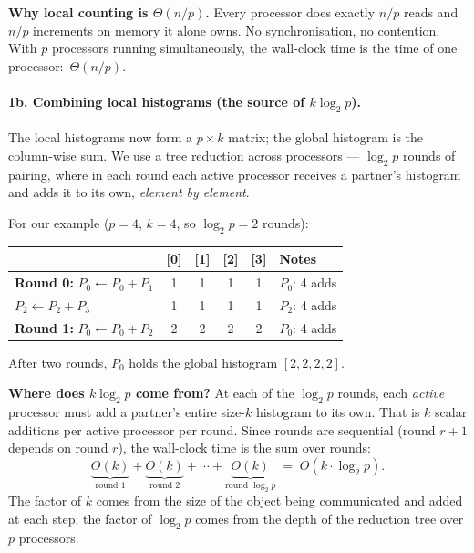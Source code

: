 \begin{ppkey}
\textbf{Why local counting is $\Theta(n/p)$.} Every processor does
exactly $n/p$ reads and $n/p$ increments on memory it alone owns. No
synchronisation, no contention. With $p$ processors running
simultaneously, the wall-clock time is the time of one
processor:~$\Theta(n/p)$.
\end{ppkey}

\paragraph{1b. Combining local histograms (the source of $k\log_2 p$).}
The local histograms now form a $p \times k$ matrix; the global
histogram is the column-wise sum. We use a tree reduction across
processors --- $\log_2 p$ rounds of pairing, where in each round each
active processor receives a partner's histogram and adds it to its own,
\emph{element by element}.

For our example ($p=4$, $k=4$, so $\log_2 p = 2$ rounds):
\begin{center}
\begin{tabular}{l|cccc|l}
\toprule
& \textbf{[0]} & \textbf{[1]} & \textbf{[2]} & \textbf{[3]} & \textbf{Notes} \\
\midrule
\textbf{Round 0:} $P_0 \leftarrow P_0 + P_1$ & 1 & 1 & 1 & 1 & $P_0$: 4 adds \\
\quad\quad\quad\;\; $P_2 \leftarrow P_2 + P_3$ & 1 & 1 & 1 & 1 & $P_2$: 4 adds \\
\midrule
\textbf{Round 1:} $P_0 \leftarrow P_0 + P_2$ & 2 & 2 & 2 & 2 & $P_0$: 4 adds \\
\bottomrule
\end{tabular}
\end{center}
After two rounds, $P_0$ holds the global histogram $[2, 2, 2, 2]$.

\begin{ppkey}
\textbf{Where does $k \log_2 p$ come from?} At each of the $\log_2 p$
rounds, each \emph{active} processor must add a partner's entire
size-$k$ histogram to its own. That is $k$ scalar additions per active
processor per round. Since rounds are sequential (round $r+1$ depends on
round $r$), the wall-clock time is the sum over rounds:
\[
\underbrace{O(k)}_{\text{round 1}} + \underbrace{O(k)}_{\text{round 2}}
+ \cdots + \underbrace{O(k)}_{\text{round } \log_2 p}
\;=\; O(k \cdot \log_2 p).
\]
The factor of $k$ comes from the size of the object being communicated
and added at each step; the factor of $\log_2 p$ comes from the depth
of the reduction tree over $p$ processors.
\end{ppkey}


